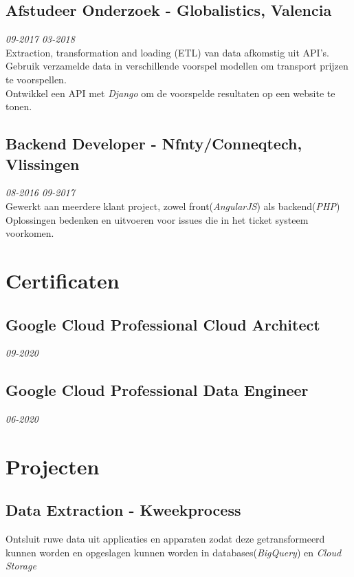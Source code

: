 \documentclass{article}
\begin{document}
\subsection{Afstudeer Onderzoek - Globalistics, Valencia} \hfill {\em 09-2017 03-2018} \\
Extraction, transformation and loading (ETL) van data afkomstig uit API's.\\
Gebruik verzamelde data in verschillende voorspel modellen om transport prijzen te voorspellen. \\
Ontwikkel een API met \emph{Django} om de voorspelde resultaten op een website te tonen. \\


\subsection{Backend Developer - Nfnty/Conneqtech, Vlissingen} \hfill {\em 08-2016 09-2017} \\
Gewerkt aan meerdere klant project, zowel front(\emph{AngularJS}) als backend(\emph{PHP})
Oplossingen bedenken en uitvoeren voor issues die in het ticket systeem voorkomen.

\section{Certificaten}
\subsection{Google Cloud Professional Cloud Architect}\hfill {\em 09-2020} \\
\subsection{Google Cloud Professional Data Engineer}\hfill {\em 06-2020} \\

\section{Projecten}
\subsection{Data Extraction - Kweekprocess}
Ontsluit ruwe data uit applicaties en apparaten zodat deze getransformeerd kunnen worden en opgeslagen kunnen worden in databases(\emph{BigQuery}) en \emph{Cloud Storage} \\
\end{document}

